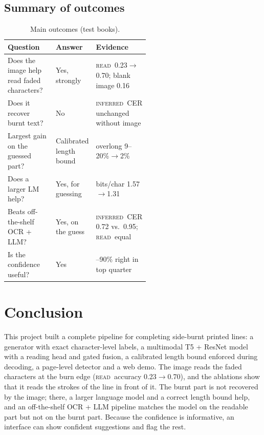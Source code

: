 \documentclass[12pt,a4paper,oneside]{report}
\newcommand{\READ}{\texorpdfstring{\textsc{read}}{READ}}
\newcommand{\INF}{\texorpdfstring{\textsc{inferred}}{INFERRED}}
\begin{document}


\section{Summary of outcomes}
\begin{table}[H]
\centering\small
\caption{Main outcomes (test books).}
\label{tab:summary}
\begin{tabularx}{\linewidth}{@{}>{\raggedright\arraybackslash}X>{\raggedright\arraybackslash}p{0.22\linewidth}>{\raggedright\arraybackslash}p{0.33\linewidth}@{}}
\toprule
Question & Answer & Evidence\\
\midrule
Does the image help read faded characters? & Yes, strongly & \READ\ 0.23$\to$0.70; blank image 0.16\\
Does it recover burnt text? & No & \INF\ CER unchanged without image\\
Largest gain on the guessed part? & Calibrated length bound & overlong 9--20\%$\to$2\%\\
Does a larger LM help? & Yes, for guessing & bits/char 1.57$\to$1.31\\
Beats off-the-shelf OCR + LLM? & Yes, on the guess & \INF\ CER 0.72 vs.\ 0.95; \READ\ equal\\
Is the confidence useful? & Yes & 88--90\% right in top quarter\\
\bottomrule
\end{tabularx}
\end{table}

\chapter{Conclusion}\label{ch:conclusion}
This project built a complete pipeline for completing side-burnt printed lines: a generator with
exact character-level labels, a multimodal T5 + ResNet model with a reading head and gated fusion,
a calibrated length bound enforced during decoding, a page-level detector and a web demo. The image
reads the faded characters at the burn edge (\READ\ accuracy 0.23$\to$0.70), and the ablations show
that it reads the strokes of the line in front of it. The burnt part is not recovered by the image;
there, a larger language model and a correct length bound help, and an off-the-shelf OCR + LLM
pipeline matches the model on the readable part but not on the burnt part. Because the confidence is
informative, an interface can show confident suggestions and flag the rest.
\end{document}
